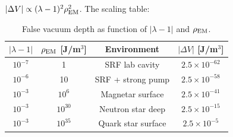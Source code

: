 \documentclass[aps,prd,twocolumn,superscriptaddress]{revtex4-2}
\newcommand{\lam}{|\lambda-1|}
\begin{document}
$|\Delta V| \propto (\lambda-1)^2\rho_{\rm EM}^2$.  The scaling table:

\begin{table}[h]
\caption{False vacuum depth as function of $\lam$ and $\rho_{\rm EM}$.}
\label{tab:fv}
\begin{ruledtabular}
\begin{tabular}{cccc}
$\lam$ & $\rho_{\rm EM}$ [J/m$^3$] & Environment & $|\Delta V|$ [J/m$^3$] \\
\hline
$10^{-7}$ & 1 & SRF lab cavity & $2.5\times 10^{-62}$ \\
$10^{-6}$ & 10 & SRF + strong pump & $2.5\times 10^{-58}$ \\
$10^{-3}$ & $10^{6}$ & Magnetar surface & $2.5\times 10^{-41}$ \\
$10^{-3}$ & $10^{30}$ & Neutron star deep & $2.5\times 10^{-15}$ \\
$10^{-3}$ & $10^{35}$ & Quark star surface & $2.5\times 10^{-5}$ \\
\end{tabular}
\end{ruledtabular}
\end{table}
\end{document}
